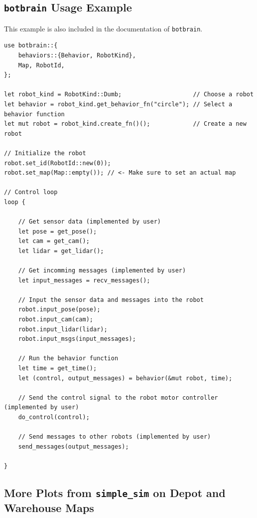 \subsection{\texttt{botbrain} Usage Example}
This example is also included in the documentation of \texttt{botbrain}.
\begin{verbatim}
use botbrain::{
    behaviors::{Behavior, RobotKind},
    Map, RobotId,
};

let robot_kind = RobotKind::Dumb;                    // Choose a robot
let behavior = robot_kind.get_behavior_fn("circle"); // Select a behavior function
let mut robot = robot_kind.create_fn()();            // Create a new robot

// Initialize the robot
robot.set_id(RobotId::new(0));
robot.set_map(Map::empty()); // <- Make sure to set an actual map

// Control loop
loop {

    // Get sensor data (implemented by user)
    let pose = get_pose();
    let cam = get_cam();
    let lidar = get_lidar();

    // Get incomming messages (implemented by user)
    let input_messages = recv_messages();

    // Input the sensor data and messages into the robot
    robot.input_pose(pose);
    robot.input_cam(cam);
    robot.input_lidar(lidar);
    robot.input_msgs(input_messages);

    // Run the behavior function
    let time = get_time();
    let (control, output_messages) = behavior(&mut robot, time);

    // Send the control signal to the robot motor controller (implemented by user)
    do_control(control);

    // Send messages to other robots (implemented by user)
    send_messages(output_messages);

}
\end{verbatim}

\newpage
\subsection{More Plots from \texttt{simple\_sim} on Depot and Warehouse Maps}
\label{appendix:more-plots}

\def\w{0.49\textwidth}

